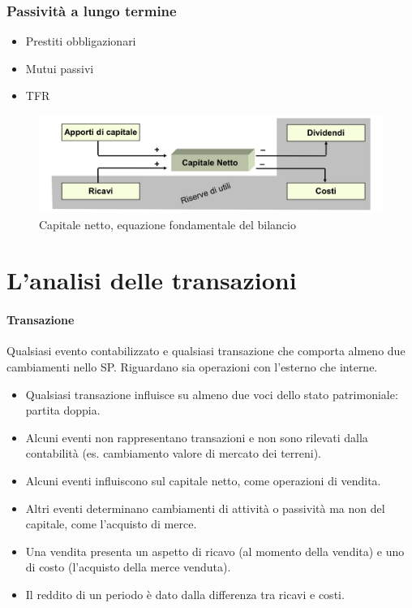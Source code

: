 \documentclass{report}
\begin{document}
	\subsubsection{Passività a lungo termine}
	\begin{itemize}
		\item Prestiti obbligazionari
		\item Mutui passivi
		\item TFR
	\end{itemize}
	\begin{figure}[h]
		\centering
		\includegraphics[width=0.7\linewidth]{capitale-netto}
		\caption{Capitale netto, equazione fondamentale del bilancio}
		\label{fig:capitale-netto}
	\end{figure}
	\section{L'analisi delle transazioni}
	\paragraph{Transazione} Qualsiasi evento contabilizzato e qualsiasi transazione che comporta almeno due cambiamenti nello SP. Riguardano sia operazioni con l'esterno che interne.
	\medskip \\
	\begin{itemize}
		\item Qualsiasi transazione influisce su almeno due voci dello stato patrimoniale: partita doppia.
		\item Alcuni eventi non rappresentano transazioni e non sono rilevati dalla contabilità (es. cambiamento valore di mercato dei terreni).
		\item Alcuni eventi influiscono sul capitale netto, come operazioni di vendita.
		\item Altri eventi determinano cambiamenti di attività o passività ma non del capitale, come l'acquisto di merce.
		\item Una vendita presenta un aspetto di ricavo (al momento della vendita) e uno di costo (l'acquisto della merce venduta).
		\item Il reddito di un periodo è dato dalla differenza tra ricavi e costi.
	\end{itemize}
\end{document}
